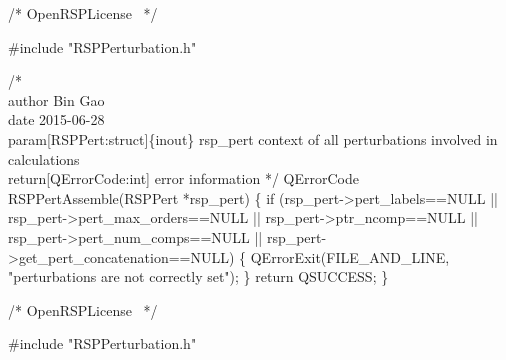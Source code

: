 \nwenddocs{}\endmoddef
/*
  \LA{}OpenRSPLicense~{\nwtagstyle{}}\RA{}
*/

#include "RSPPerturbation.h"

/*%
    \\author Bin Gao
    \\date 2015-06-28
    \\param[RSPPert:struct]\{inout\} rsp_pert context of all perturbations involved in calculations
    \\return[QErrorCode:int] error information
*/
QErrorCode RSPPertAssemble(RSPPert *rsp_pert)
\{
    if (rsp_pert->pert_labels==NULL ||
        rsp_pert->pert_max_orders==NULL ||
        rsp_pert->ptr_ncomp==NULL ||
        rsp_pert->pert_num_comps==NULL ||
        rsp_pert->get_pert_concatenation==NULL) \{
        QErrorExit(FILE_AND_LINE, "perturbations are not correctly set");
    \}
    return QSUCCESS;
\}

\nwendcode{}\endmoddef
/*
  \LA{}OpenRSPLicense~{\nwtagstyle{}}\RA{}
*/

#include "RSPPerturbation.h"

